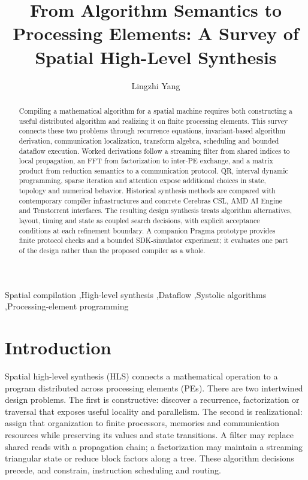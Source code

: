 \documentclass[final,3p,times,authoryear]{elsarticle}
\begin{document}
\begin{frontmatter}
\title{From Algorithm Semantics to Processing Elements: A Survey of Spatial High-Level Synthesis}
\author{Lingzhi Yang}
\address{Department of Applied Mathematics and Statistics, Stony Brook University}
\begin{abstract}
Compiling a mathematical algorithm for a spatial machine requires both constructing a useful distributed algorithm and realizing it on finite processing elements. This survey connects these two problems through recurrence equations, invariant-based algorithm derivation, communication localization, transform algebra, scheduling and bounded dataflow execution. Worked derivations follow a streaming filter from shared indices to local propagation, an FFT from factorization to inter-PE exchange, and a matrix product from reduction semantics to a communication protocol. QR, interval dynamic programming, sparse iteration and attention expose additional choices in state, topology and numerical behavior. Historical synthesis methods are compared with contemporary compiler infrastructures and concrete Cerebras CSL, AMD AI Engine and Tenstorrent interfaces. The resulting design synthesis treats algorithm alternatives, layout, timing and state as coupled search decisions, with explicit acceptance conditions at each refinement boundary. A companion Pragma prototype provides finite protocol checks and a bounded SDK-simulator experiment; it evaluates one part of the design rather than the proposed compiler as a whole.
\end{abstract}
\begin{keyword}
Spatial compilation \sep High-level synthesis \sep Dataflow \sep Systolic algorithms \sep Processing-element programming
\end{keyword}
\end{frontmatter}
\raggedbottom

\section{Introduction}
Spatial high-level synthesis (HLS) connects a mathematical operation to a program distributed across processing elements (PEs). There are two intertwined design problems. The first is constructive: discover a recurrence, factorization or traversal that exposes useful locality and parallelism. The second is realizational: assign that organization to finite processors, memories and communication resources while preserving its values and state transitions. A filter may replace shared reads with a propagation chain; a factorization may maintain a streaming triangular state or reduce block factors along a tree. These algorithm decisions precede, and constrain, instruction scheduling and routing.
\end{document}

